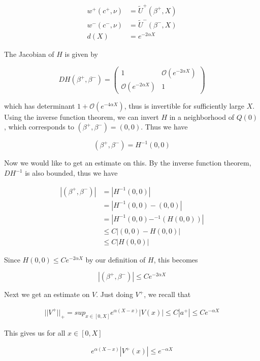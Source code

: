 \documentclass[12pt]{article}
\begin{document}
\begin{align*}
w^+(c^+, \nu) &= \tilde{U}^+(\beta^+, X) \\
w^-(c^-, \nu) &= \tilde{U}^-(\beta^-, X) \\
d(X) &= e^{-2 \alpha X}
\end{align*}

The Jacobian of $H$ is given by 

\begin{equation}
D H(\beta^+, \beta^-) = 
\begin{pmatrix}
1 & \mathcal{O}(e^{-2 \alpha X}) \\
\mathcal{O}(e^{-2 \alpha X}) &  1 
\end{pmatrix}
\end{equation}

which has determinant $1 + \mathcal{O}(e^{-4 \alpha X})$, thus is invertible for sufficiently large $X$. Using the inverse function theorem, we can invert $H$ in a neighborhood of $Q(0)$, which corresponds to $(\beta^+, \beta^-) = (0, 0)$. Thus we have 

\[
(\beta^+, \beta^-) = H^{-1}(0, 0)
\]

Now we would like to get an estimate on this. By the inverse function theorem, $D H^{-1}$ is also bounded, thus we have 

\begin{align*}
| (\beta^+, \beta^-) | &= | H^{-1}(0, 0) | \\
&= | H^{-1}(0, 0) - (0, 0) | \\
&= | H^{-1}(0, 0) - ^{-1}(H(0, 0)) | \\
& \leq C | (0, 0) - H(0, 0) | \\
& \leq C |H(0, 0)|
\end{align*}

Since $H(0, 0) \leq C e^{-2 \alpha X}$ by our definition of $H$, this becomes

\[
| (\beta^+, \beta^-) | \leq C e^{-2 \alpha X}
\]

Next we get an estimate on $V$. Just doing $V^+$, we recall that

\begin{align*}
||V^+||_+ = sup_{x \in [0, X]} e^{\alpha(X - x)}|V(x)| \leq C |a^+| \leq C e^{-\alpha X}
\end{align*}

This gives us for all $x \in [0, X]$

\begin{align*}
e^{\alpha(X - x)}|V^+(x)| \leq e^{-\alpha X} 
\end{align*}
\end{document}
